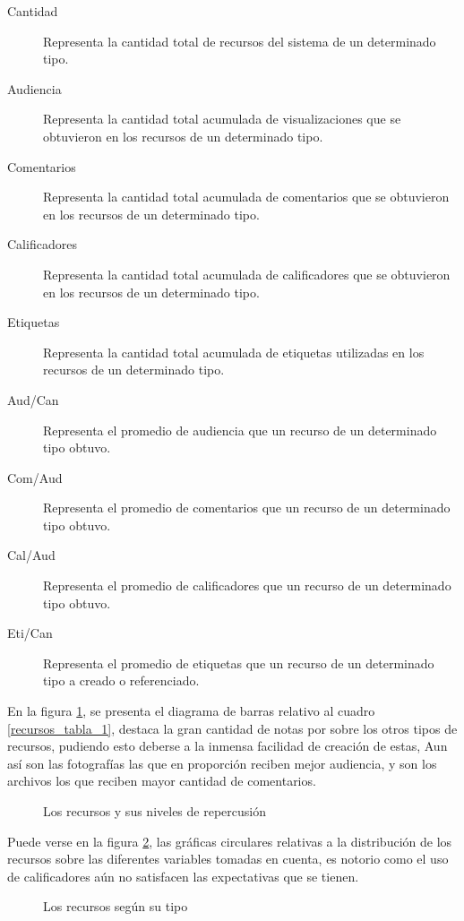 \begin{description}
\item [Cantidad] Representa la cantidad total de recursos del sistema de un
determinado tipo.
\item [Audiencia] Representa la cantidad total acumulada de visualizaciones que
se obtuvieron en los recursos de un determinado tipo.
\item [Comentarios] Representa la cantidad total acumulada de comentarios que
se obtuvieron en los recursos de un determinado tipo.
\item [Calificadores] Representa la cantidad total acumulada de calificadores
que se obtuvieron en los recursos de un determinado tipo.
\item [Etiquetas] Representa la cantidad total acumulada de etiquetas utilizadas
en los recursos de un determinado tipo.
\item [Aud/Can] Representa el promedio de audiencia que un recurso de un
determinado tipo obtuvo.
\item [Com/Aud] Representa el promedio de comentarios que un recurso de un
determinado tipo obtuvo.
\item [Cal/Aud] Representa el promedio de calificadores que un recurso de un
determinado tipo obtuvo.
\item [Eti/Can] Representa el promedio de etiquetas que un recurso de un
determinado tipo a creado o referenciado.
\end{description}

En la figura \ref{recursos_bars_1}, se presenta el diagrama de barras relativo
al cuadro \ref{recursos_tabla_1}, destaca la gran cantidad de notas por sobre
los otros tipos de recursos, pudiendo esto deberse a la inmensa facilidad de
creación de estas, Aun así son las fotografías las que en proporción reciben
mejor audiencia, y son los archivos los que reciben mayor cantidad de 
comentarios.

\begin{figure}
\centering

\caption{Los recursos y sus niveles de repercusión}
\label{recursos_bars_1}
\end{figure}

Puede verse en la figura \ref{recursos_pie_1}, las gráficas circulares relativas
a la distribución de los recursos sobre las diferentes variables tomadas en
cuenta, es notorio como el uso de calificadores aún no satisfacen las
expectativas que se tienen.

\begin{figure}
\centering

\caption{Los recursos según su tipo}
\label{recursos_pie_1}
\end{figure}

